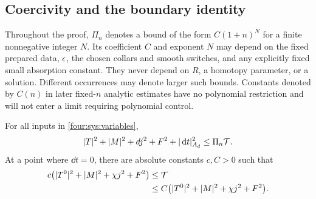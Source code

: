 \subsection{Coercivity and the boundary identity}

Throughout the proof, $\Pi_n$ denotes a bound of the form
$C(1+n)^N$ for a finite nonnegative integer $N$.  Its coefficient $C$ and
exponent $N$ may depend on the fixed prepared data, $\epsilon$, the chosen
collars and smooth switches, and any explicitly fixed small absorption
constant.  They never depend on $R$, a homotopy parameter, or a solution.
Different occurrences may denote larger such bounds.  Constants denoted
by $C(n)$ in later fixed-$n$ analytic estimates have no polynomial
restriction and will not enter a limit requiring polynomial control.

\begin{lemma}\label{four:sys:coercivity-lemma}
For all inputs in \eqref{four:sys:variables},
\begin{equation}\label{four:eq:coercivity}
 |T|^2+|M|^2+d j^2+F^2+|\,\mathrm d t|_{A_d}^2\le\Pi_n\mathcal T.
\end{equation}
At a point where $\dd t=0$, there are absolute constants $c,C>0$ such
that
\begin{equation}\label{four:sys:stationary-coercivity}
 \begin{aligned}
 c\bigl(|T^0|^2+|M|^2+\chi j^2+F^2\bigr)&\le\mathcal T\\
 &\le C\bigl(|T^0|^2+|M|^2+\chi j^2+F^2\bigr).
 \end{aligned}
\end{equation}
\end{lemma}

